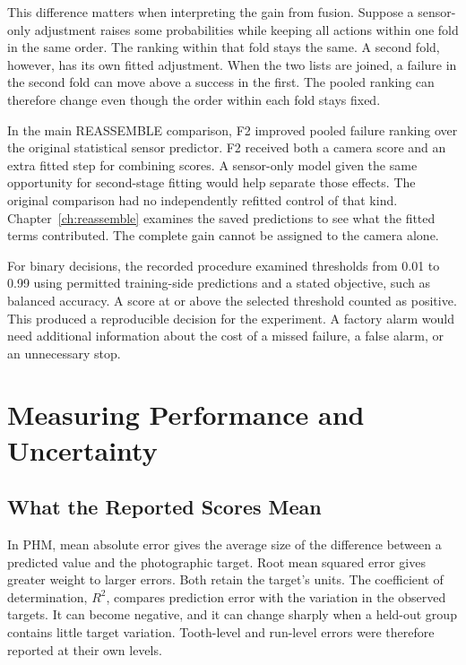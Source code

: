 This difference matters when interpreting the gain from fusion. Suppose a sensor-only
adjustment raises some probabilities while keeping all actions within one fold in the
same order. The ranking within that fold stays the same. A second fold, however, has its
own fitted adjustment. When the two lists are joined, a failure in the second fold can
move above a success in the first. The pooled ranking can therefore change even
though the order within each fold stays fixed.

In the main REASSEMBLE comparison, F2 improved pooled failure ranking over the original
statistical sensor predictor. F2 received both a camera score and an extra fitted step
for combining scores. A sensor-only model given the same opportunity for second-stage
fitting would help separate those effects. The original comparison had no independently
refitted control of that kind. Chapter~\ref{ch:reassemble} examines the saved predictions to see what the
fitted terms contributed. The complete gain cannot be assigned to the camera alone.

For binary decisions, the recorded procedure examined thresholds from 0.01 to 0.99 using
permitted training-side predictions and a stated objective, such as balanced accuracy. A
score at or above the selected threshold counted as positive. This produced a
reproducible decision for the experiment. A factory alarm would need additional
information about the cost of a missed failure, a false alarm, or an unnecessary stop.

\section{Measuring Performance and Uncertainty}
\label{sec:ch4-metrics}

\subsection{What the Reported Scores Mean}

In PHM, mean absolute error gives the average size of the difference between a
predicted value and the photographic target. Root mean squared error gives
greater weight to larger errors. Both retain the target's units. The coefficient of
determination, \(R^2\), compares prediction error with the variation in the observed
targets. It can become negative, and it can change sharply when a held-out group
contains little target variation. Tooth-level and run-level errors were therefore
reported at their own levels.

